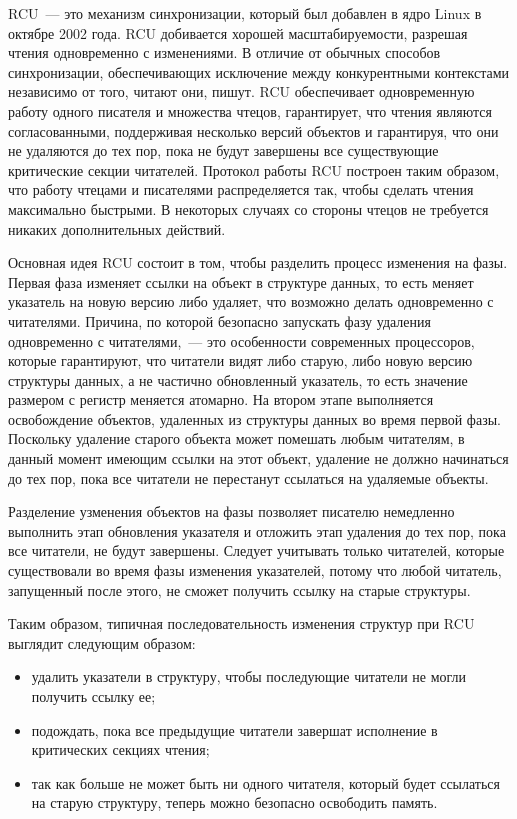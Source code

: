 
RCU~--- это механизм синхронизации, который был добавлен в ядро Linux в октябре
2002 года. RCU добивается хорошей масштабируемости, разрешая чтения одновременно
с изменениями. В отличие от обычных способов синхронизации, обеспечивающих
исключение между конкурентными контекстами независимо от того, читают они,
пишут. RCU обеспечивает одновременную работу одного писателя и множества чтецов,
гарантирует, что чтения являются согласованными, поддерживая несколько версий
объектов и гарантируя, что они не удаляются до тех пор, пока не будут завершены
все существующие критические секции читателей. Протокол работы RCU построен
таким образом, что работу чтецами и писателями распределяется так, чтобы сделать
чтения максимально быстрыми. В некоторых случаях со стороны чтецов не требуется
никаких дополнительных действий.

Основная идея RCU состоит в том, чтобы разделить процесс изменения на фазы.
Первая фаза изменяет ссылки на объект в структуре данных, то есть меняет
указатель на новую версию либо удаляет, что возможно делать одновременно с
читателями. Причина, по которой безопасно запускать фазу удаления одновременно с
читателями,~--- это особенности современных процессоров, которые гарантируют,
что читатели видят либо старую, либо новую версию структуры данных, а не
частично обновленный указатель, то есть значение размером с регистр меняется
атомарно. На втором этапе выполняется освобождение объектов, удаленных из
структуры данных во время первой фазы. Поскольку удаление старого объекта может
помешать любым читателям, в данный момент имеющим ссылки на этот объект,
удаление не должно начинаться до тех пор, пока все читатели не перестанут
ссылаться на удаляемые объекты.

Разделение узменения объектов на фазы позволяет писателю немедленно выполнить
этап обновления указателя и отложить этап удаления до тех пор, пока все
читатели, не будут завершены. Следует учитывать только читателей, которые
существовали во время фазы изменения указателей, потому что любой читатель,
запущенный после этого, не сможет получить ссылку на старые структуры.

Таким образом, типичная последовательность изменения структур при RCU выглядит
следующим образом:
\begin{itemize}
\item удалить указатели в структуру, чтобы последующие читатели не могли
  получить ссылку ее;
\item подождать, пока все предыдущие читатели завершат исполнение в критических
  секциях чтения;
\item так как больше не может быть ни одного читателя, который будет ссылаться
  на старую структуру, теперь можно безопасно освободить память.
\end{itemize}

